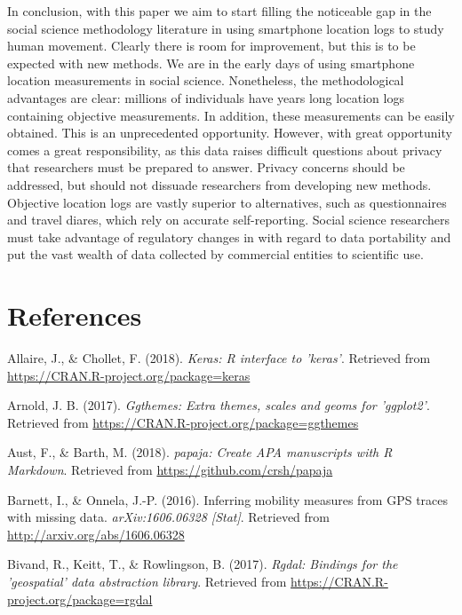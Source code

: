 \documentclass[man]{apa6}
\theoremstyle{definition}
\theoremstyle{definition}
\theoremstyle{definition}
\theoremstyle{remark}
\begin{document}
In conclusion, with this paper we aim to start filling the noticeable
gap in the social science methodology literature in using smartphone
location logs to study human movement. Clearly there is room for
improvement, but this is to be expected with new methods. We are in the
early days of using smartphone location measurements in social science.
Nonetheless, the methodological advantages are clear: millions of
individuals have years long location logs containing objective
measurements. In addition, these measurements can be easily obtained.
This is an unprecedented opportunity. However, with great opportunity
comes a great responsibility, as this data raises difficult questions
about privacy that researchers must be prepared to answer. Privacy
concerns should be addressed, but should not dissuade researchers from
developing new methods. Objective location logs are vastly superior to
alternatives, such as questionnaires and travel diares, which rely on
accurate self-reporting. Social science researchers must take advantage
of regulatory changes in with regard to data portability and put the
vast wealth of data collected by commercial entities to scientific use.

\newpage

\section{References}\label{references}

\begingroup
\setlength{\parindent}{-0.5in} \setlength{\leftskip}{0.5in}

\hypertarget{refs}{}
\hypertarget{ref-R-keras}{}
Allaire, J., \& Chollet, F. (2018). \emph{Keras: R interface to
'keras'}. Retrieved from \url{https://CRAN.R-project.org/package=keras}

\hypertarget{ref-R-ggthemes}{}
Arnold, J. B. (2017). \emph{Ggthemes: Extra themes, scales and geoms for
'ggplot2'}. Retrieved from
\url{https://CRAN.R-project.org/package=ggthemes}

\hypertarget{ref-R-papaja}{}
Aust, F., \& Barth, M. (2018). \emph{papaja: Create APA manuscripts with
R Markdown}. Retrieved from \url{https://github.com/crsh/papaja}

\hypertarget{ref-barnett_inferring_2016}{}
Barnett, I., \& Onnela, J.-P. (2016). Inferring mobility measures from
GPS traces with missing data. \emph{arXiv:1606.06328 {[}Stat{]}}.
Retrieved from \url{http://arxiv.org/abs/1606.06328}

\hypertarget{ref-R-rgdal}{}
Bivand, R., Keitt, T., \& Rowlingson, B. (2017). \emph{Rgdal: Bindings
for the 'geospatial' data abstraction library}. Retrieved from
\url{https://CRAN.R-project.org/package=rgdal}
\end{document}
